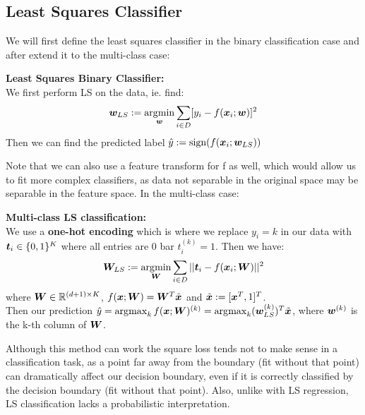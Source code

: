 \subsection{Least Squares Classifier}
We will first define the least squares classifier in the binary classification case and after extend it to the multi-class case:
\begin{definition}
    \textbf{Least Squares Binary Classifier:} \\
    We first perform LS on the data, ie. find:
    \begin{equation}
        \bm{w}_{LS} := \operatorname*{arg\!\min}_{\bm{w}} \sum_{i \in D} [y_{i} - f(\bm{x}_{i} ; \bm{w})]^{2}
    \end{equation}
    Then we can find the predicted label $\hat{y}:= \text{sign}(f(\bm{x}_{i};\bm{w}_{LS}))$
\end{definition}
Note that we can also use a feature transform for f as well, which would allow us to fit more complex classifiers, as data not separable in the original space may be separable in the feature space. In the multi-class case:
\begin{definition} \label{def:multi-class-LS-class}
    \textbf{Multi-class LS classification:} \\
    We use a \textbf{one-hot encoding} which is where we replace $y_{i}=k$ in our data with $\bm{t}_{i} \in \{0,1\}^{K}$ where all entries are 0 bar $t_{i}^{(k)}=1$. Then we have:
    \begin{equation}
        \bm{W}_{LS} := \operatorname*{arg\!\min}_{\bm{W}} \sum_{i \in D} ||\bm{t}_{i} - f(\bm{x}_{i} ; \bm{W})||^{2}
    \end{equation}
    where $\bm{W} \in \mathbb{R}^{(d+1) \times K}$, $f(\bm{x};\bm{W})=\bm{W}^{T} \tilde{\bm{x}}$ and $\tilde{\bm{x}} := [\bm{x}^{T}, 1]^{T}$.\\
    Then our prediction $\hat{y} = \operatorname*{arg\!\max}_{k} f(\bm{x};\bm{W})^{(k)} = \operatorname*{arg\!\max}_{k}(\bm{w}_{LS}^{(k)})^{T} \tilde{\bm{x}}$, where $\bm{w}^{(k)}$ is the k-th column of $\bm{W}$.
\end{definition}
Although this method can work the square loss tends not to make sense in a classification task, as a point far away from the boundary (fit without that point) can dramatically affect our decision boundary, even if it is correctly classified by the decision boundary (fit without that point). Also, unlike with LS regression, LS classification lacks a probabilistic interpretation.

